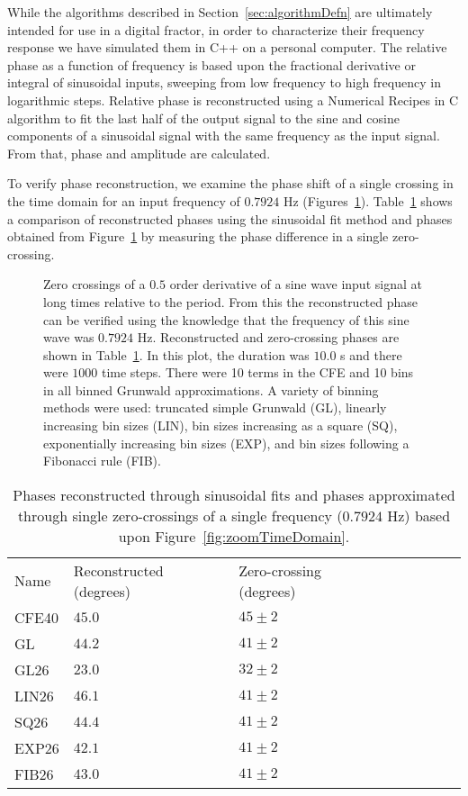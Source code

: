 While the algorithms described in Section~\ref{sec:algorithmDefn} are
ultimately intended for use in a digital fractor, in order to
characterize their frequency response we have simulated them in C++ on a
personal computer. The relative phase as a function of frequency is based upon the
fractional derivative or integral of sinusoidal inputs, sweeping from
low frequency to high frequency in logarithmic steps. Relative phase
is reconstructed using a Numerical Recipes in C algorithm to fit the last
half of the output signal to the sine and cosine components of a
sinusoidal signal with the same frequency as the input signal. From that, phase and amplitude are calculated. 

To verify phase reconstruction, we examine the phase shift of a single
crossing in the time domain for an input frequency of $0.7924$ Hz
(Figures~\ref{fig:timeDomain}). Table~\ref{tab:phaseRecon}
shows a comparison of reconstructed phases using the sinusoidal fit
method and phases obtained from Figure~\ref{fig:timeDomain} by
measuring the phase difference in a single zero-crossing.


\begin{figure}
\begin{center}
\end{center}
\caption{Zero crossings of a $0.5$ order derivative of a sine wave input signal
at long times relative to the period. From this the reconstructed
  phase can be verified using the knowledge that the frequency of this
  sine wave was $0.7924$ Hz. Reconstructed and zero-crossing phases
  are shown in Table~\ref{tab:phaseRecon}. In this plot, the duration
  was $10.0$ s and there were $1000$ time steps. There were 10 terms
  in the CFE and 10 bins in all binned Grunwald approximations. A
  variety of binning methods were used: truncated simple Grunwald
  (GL), linearly increasing bin sizes (LIN), bin sizes increasing as a
  square (SQ), exponentially increasing bin sizes (EXP), and bin sizes
  following a Fibonacci rule (FIB).}
\label{fig:timeDomain}
\end{figure}

\begin{table}
\begin{tabular}{llllllll}
\hline
Name &Reconstructed (degrees) &Zero-crossing (degrees)\\ CFE40 &$45.0$
&$45\pm 2$\\ GL &$44.2$ &$41\pm 2$\\ GL26 &$23.0$ &$32\pm 2$\\ LIN26
&$46.1$ &$41\pm 2$\\ SQ26 &$44.4$ &$41\pm 2$\\ EXP26 &$42.1$ &$41\pm
2$\\ FIB26 &$43.0$ &$41\pm 2$\\
\hline
\end{tabular}
\label{tab:phaseRecon}
\caption{Phases reconstructed through sinusoidal fits and phases approximated through single zero-crossings of a single frequency ($0.7924$ Hz) based upon Figure~\ref{fig:zoomTimeDomain}.}
\end{table}

